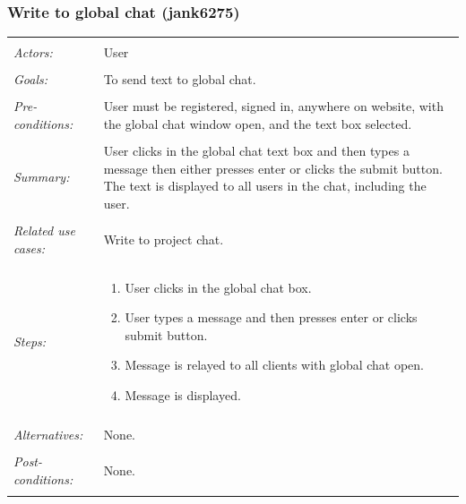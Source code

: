 \documentclass[11pt]{report}
\begin{document}
\subsubsection{Write to global chat (jank6275)}
\begin{tabular}{ p{2cm} p{12cm} }
 \hline
 \\
 \textit{Actors:} & User \\ 
 \\
 \textit{Goals:} & To send text to global chat. \\
 \\
 \textit{Pre-conditions:} & User must be registered, signed in, anywhere on website, with the global chat window open, and the text box selected.  \\
 \\
 \textit{Summary:} & User clicks in the global chat text box and then types a message then either presses enter or clicks the submit button. The text is displayed to all users in the chat, including the user. \\ 
 \\
 \textit{Related use cases:} & Write to project chat. \\ 
 \\
 \textit{Steps:} & \begin{enumerate}
  \item User clicks in the global chat box.
  \item User types a message and then presses enter or clicks submit button.
  \item Message is relayed to all clients with global chat open.
  \item Message is displayed.
 \end{enumerate} \\
 \\
 \textit{Alternatives:} & None. \\
 \\
 \textit{Post-conditions:} & None. \\
 \\
\hline
\end{tabular}
\end{document}
